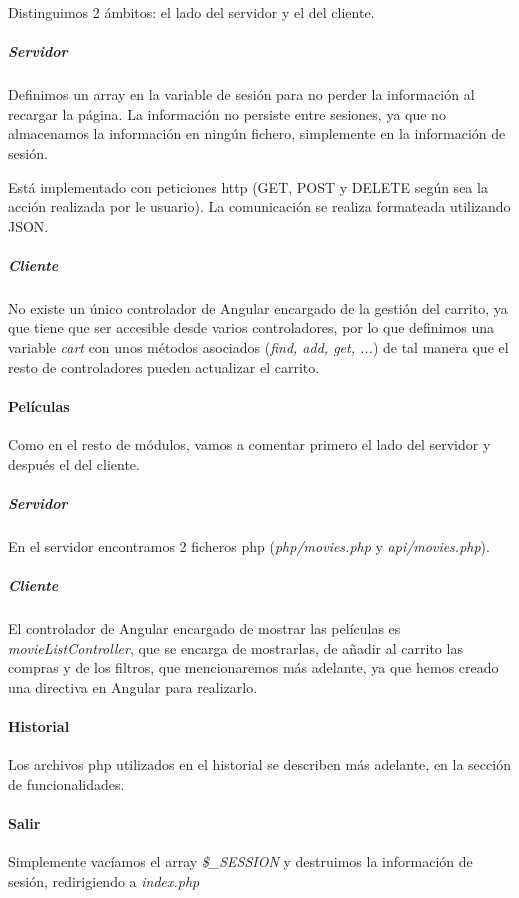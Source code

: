 \documentclass{apuntes}
\begin{document}
Distinguimos 2 ámbitos: el lado del servidor y el del cliente. \label{Carrito}

\subparagraph{Servidor}


Definimos un array en la variable de sesión para no perder la información al recargar la página. La información no persiste entre sesiones, ya que no almacenamos la información en ningún fichero, simplemente en la información de sesión.

Está implementado con peticiones http (GET, POST y DELETE según sea la acción realizada por le usuario). La comunicación se realiza formateada utilizando JSON.

\subparagraph{Cliente}

No existe un único controlador de Angular encargado de la gestión del carrito, ya que tiene que ser accesible desde varios controladores, por lo que definimos una variable \textit{cart} con unos métodos asociados (\textit{find, add, get, ...}) de tal manera que el resto de controladores pueden actualizar el carrito.

\paragraph{Películas}

Como en el resto de módulos, vamos a comentar primero el lado del servidor y después el del cliente.


\subparagraph{Servidor}
En el servidor encontramos 2 ficheros php (\textit{php/movies.php} y \textit{api/movies.php}).


\subparagraph{Cliente}
El controlador de Angular encargado de mostrar las películas es \textit{movieListController}, que se encarga de mostrarlas, de añadir al carrito las compras y de los filtros, que mencionaremos más adelante, ya que hemos creado una directiva en Angular para realizarlo.


\paragraph{Historial} Los archivos php utilizados en el historial se describen más adelante, en la sección de funcionalidades.

\paragraph{Salir}

Simplemente vacíamos el array \textit{\$\_SESSION} y destruimos la información de sesión, redirigiendo a \textit{index.php}
\end{document}
